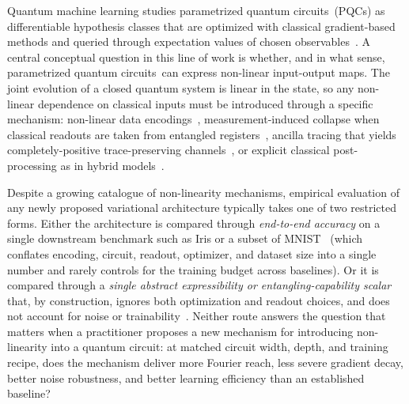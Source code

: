\documentclass{article}
\newcommand{\pqcs}{parametrized quantum circuits}
\begin{document}
Quantum machine learning studies \pqcs\ (PQCs) as differentiable hypothesis classes that are optimized with classical gradient-based methods and queried through expectation values of chosen observables~\citep{benedetti2019pqcml,cerezo2021cost,bharti2022nisq}.
A central conceptual question in this line of work is whether, and in what sense, \pqcs\ can express non-linear input-output maps.
The joint evolution of a closed quantum system is linear in the state, so any non-linear dependence on classical inputs must be introduced through a specific mechanism: non-linear data encodings~\citep{schuld2021effect,perez2020data}, measurement-induced collapse when classical readouts are taken from entangled registers~\citep{havlicek2019supervised,schuld2019quantum}, ancilla tracing that yields completely-positive trace-preserving channels~\citep{nielsen2010quantum}, or explicit classical post-processing as in hybrid models~\citep{mari2020transfer}.

Despite a growing catalogue of non-linearity mechanisms, empirical evaluation of any newly proposed variational architecture typically takes one of two restricted forms.
Either the architecture is compared through \emph{end-to-end accuracy} on a single downstream benchmark such as Iris or a subset of MNIST~\citep{schuld2020circuit} (which conflates encoding, circuit, readout, optimizer, and dataset size into a single number and rarely controls for the training budget across baselines).
Or it is compared through a \emph{single abstract expressibility or entangling-capability scalar}~\citep{sim2019expressibility} that, by construction, ignores both optimization and readout choices, and does not account for noise or trainability~\citep{mcclean2018barren,holmes2022connecting,ragone2024unified}.
Neither route answers the question that matters when a practitioner proposes a new mechanism for introducing non-linearity into a quantum circuit: at matched circuit width, depth, and training recipe, does the mechanism deliver more Fourier reach, less severe gradient decay, better noise robustness, and better learning efficiency than an established baseline?
\end{document}
